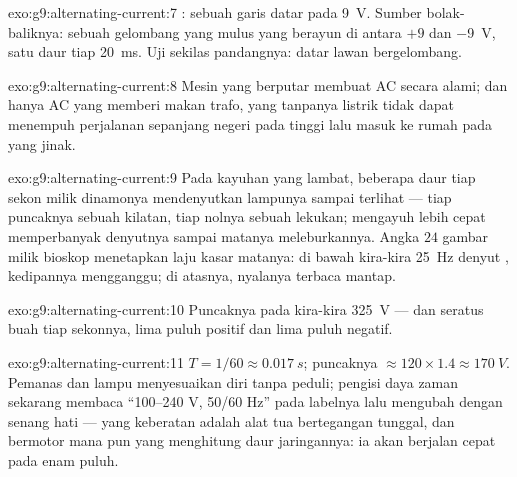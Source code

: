 \begin{solution}{exo:g9:alternating-current:7}
: sebuah garis datar pada \qty{9}{V}. Sumber bolak-baliknya:
sebuah gelombang yang mulus yang berayun di antara $+9$ dan
\qty{-9}{V}, satu daur tiap \qty{20}{ms}. Uji sekilas pandangnya:
datar lawan bergelombang.
\end{solution}

\begin{solution}{exo:g9:alternating-current:8}
Mesin yang berputar membuat AC secara alami; dan hanya AC yang memberi
makan trafo, yang tanpanya listrik tidak dapat menempuh perjalanan
sepanjang negeri pada  tinggi lalu masuk ke rumah pada
 yang jinak.
\end{solution}

\begin{solution}{exo:g9:alternating-current:9}
Pada kayuhan yang lambat, beberapa daur tiap sekon milik dinamonya
mendenyutkan lampunya sampai terlihat --- tiap puncaknya sebuah
kilatan, tiap nolnya sebuah lekukan; mengayuh lebih cepat
memperbanyak denyutnya sampai matanya meleburkannya. Angka $24$ gambar
milik bioskop menetapkan laju  kasar matanya: di bawah
kira-kira \qty{25}{Hz} denyut , kedipannya mengganggu; di
atasnya, nyalanya terbaca mantap.
\end{solution}

\begin{solution}{exo:g9:alternating-current:10}
Puncaknya pada kira-kira \qty{325}{V} --- dan seratus buah tiap
sekonnya, lima puluh positif dan lima puluh negatif.
\end{solution}

\begin{solution}{exo:g9:alternating-current:11}
$T = 1/60 \approx \qty{0.017}{s}$; puncaknya $\approx 120 \times
1.4 \approx \qty{170}{V}$. Pemanas dan lampu menyesuaikan diri tanpa
peduli; pengisi daya zaman sekarang membaca ``100--240 V, 50/60 Hz''
pada labelnya lalu mengubah dengan senang hati --- yang keberatan
adalah alat tua bertegangan tunggal, dan  bermotor mana pun yang
menghitung daur jaringannya: ia akan berjalan cepat pada enam puluh.
\end{solution}

